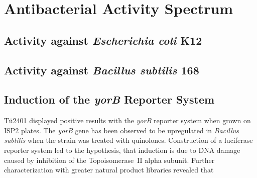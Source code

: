     


\section{Antibacterial Activity Spectrum} %
\label{sec:antibacterial_activity_spectrum}


    \subsection{Activity against \textit{Escherichia coli} K12} %
    \label{sub:activity_against_e_coli}


    \subsection{Activity against \textit{Bacillus subtilis} 168} %
    \label{sub:activity_against_b_subtilis}


    \subsection{Induction of the \textit{yorB} Reporter System} %
    \label{sub:induction_of_the_yorb_reporter_system}

    Tü2401 displayed positive results with the \textit{yorB} reporter system when grown on ISP2 plates.
    The \textit{yorB} gene has been observed to be upregulated in \textit{Bacillus subtilis} when the strain was treated with quinolones.\autocite{Hutter2004a}
    Construction of a luciferase reporter system led to the hypothesis, that induction is due to DNA damage caused by inhibition of the Topoisomerase~II alpha subunit.\autocite{Hutter2004}
    Further characterization with greater natural product libraries revealed that 
    
